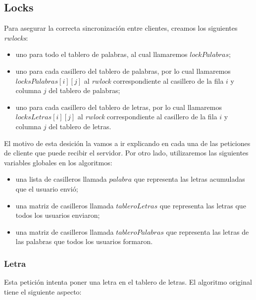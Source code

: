\subsection{Locks}

Para asegurar la correcta sincronización entre clientes, creamos los siguientes \emph{rwlocks}:

\begin{itemize}

    \item uno para todo el tablero de palabras, al cual llamaremos $lockPalabras$;
    
    \item uno para cada casillero del tablero de palabras, por lo cual llamaremos $locksPalabras[i][j]$ al \emph{rwlock} correspondiente al casillero de la fila $i$ y columna $j$ del tablero de palabras;
    
    \item uno para cada casillero del tablero de letras, por lo cual llamaremos $locksLetras[i][j]$ al \emph{rwlock} correspondiente al casillero de la fila $i$ y columna $j$ del tablero de letras.

\end{itemize}

El motivo de esta desición la vamos a ir explicando en cada una de las peticiones de cliente que puede recibir el servidor. Por otro lado, utilizaremos las siguientes variables globales en los algoritmos:

\begin{itemize}

    \item una lista de casilleros llamada $palabra$ que representa las letras acumuladas que el usuario envió;
    
    \item una matriz de casilleros llamada $tableroLetras$ que representa las letras que todos los usuarios enviaron;
    
    \item una matriz de casilleros llamada $tableroPalabras$ que representa las letras de las palabras que todos los usuarios formaron.

\end{itemize}

\subsubsection{Letra}

Esta petición intenta poner una letra en el tablero de letras. El algoritmo original tiene el siguiente aspecto:

